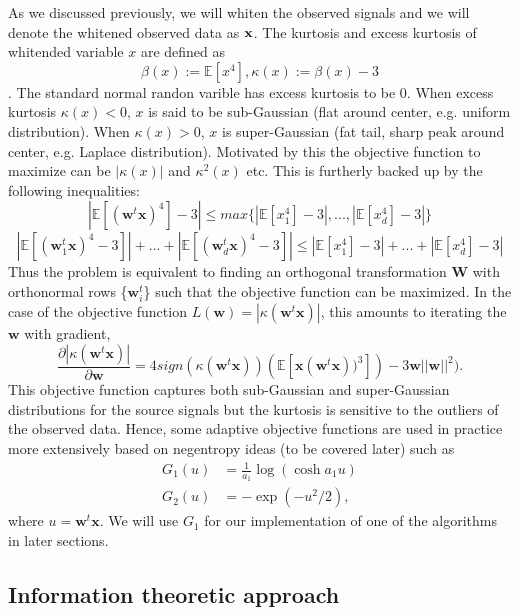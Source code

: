 \documentclass[aps,prl,preprint,superscriptaddress]{revtex4-2}
\begin{document}
As we discussed previously, we will whiten the observed signals and we will denote the whitened observed data as $\bf{x}$. The kurtosis and excess kurtosis of whitended variable $x$ are defined as $$ \beta(x) := \mathbb{E}[x^{4}], \kappa(x) := \beta(x)-3 $$. The standard normal randon varible has excess kurtosis to be 0. When excess kurtosis $\kappa(x) < 0$, $x$ is said to be sub-Gaussian (flat around center, e.g. uniform distribution). When $\kappa(x) > 0$, $x$ is super-Gaussian (fat tail, sharp peak around center, e.g. Laplace distribution). Motivated by this the objective function to maximize can be $|\kappa(x)|$ and $\kappa^{2}(x)$ etc. This is furtherly backed up by the following inequalities: 
\begin{equation}
|\mathbb{E}[(\mathbf{w}^{t}\mathbf{x})^{4}]-3| \leq max\{|\mathbb{E}[x_{1}^{4}]-3|,...,|\mathbb{E}[x_{d}^{4}]-3|\}
\end{equation}
\begin{equation}
|\mathbb{E}[(\mathbf{w}_{1}^{t}\mathbf{x})^{4}-3]|+...+|\mathbb{E}[(\mathbf{w}_{d}^{t}\mathbf{x})^{4}-3]| \leq |\mathbb{E}[x_{1}^{4}]-3|+...+|\mathbb{E}[x_{d}^{4}]-3|
\end{equation}
Thus the problem is equivalent to finding an orthogonal transformation $\mathbf{W}$ with orthonormal rows \{$\mathbf{w}_{i}^{t}$\} such that the objective function can be maximized. In the case of the objective function $L(\mathbf{w}) = |\kappa(\mathbf{w}^{t}\mathbf{x})|$, this amounts to iterating the $\mathbf{w}$ with gradient,
\begin{equation}
\frac{\partial |\kappa(\mathbf{w}^{t}\mathbf{x})|}{\partial \mathbf{w}} = 4 sign(\kappa(\mathbf{w}^{t}\mathbf{x}))(\mathbb{E}[\mathbf{x}(\mathbf{w}^{t}\mathbf{x}))^{3}])-3\mathbf{w}||\mathbf{w}||^{2}).
\end{equation} 
This objective function captures both sub-Gaussian and super-Gaussian distributions for the source signals but the kurtosis is sensitive to the outliers of the observed data. Hence, some adaptive objective functions are used in practice more extensively based on negentropy ideas (to be covered later) such as \begin{align}
G_{1}(u) &= \frac{1}{a_{1}}\log(\cosh a_{1}u) \\
G_{2}(u) &= -\exp(-u^{2}/2), 
\end{align} where $u = \mathbf{w}^{t}\mathbf{x}$. We will use $G_{1}$ for our implementation of one of the algorithms in later sections. 

\subsection{Information theoretic approach}
\end{document}
